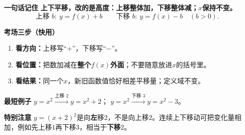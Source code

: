 \begin{summarybox}
  \textbf{\textcolor{CSummary}{一句话记住}}
  \textbf{上下平移，改的是高度：上移整体加，下移整体减；$x$保持不变。}
  \[
    \boxed{\text{上移 }b:\ y=f(x)+b}\qquad
    \boxed{\text{下移 }b:\ y=f(x)-b}\quad(b>0).
  \]

  \medskip
  \textbf{\textcolor{CSummary}{考场三步（快用）}}
  \begin{enumerate}[leftmargin=*,itemsep=0.22em,topsep=0.2em]
    \item \textbf{看方向：}上移写“$+$”，下移写“$-$”。
    \item \textbf{看位置：}把数加减在\textbf{整个$f(x)$外面}；不要随意放进$x$的括号里。
    \item \textbf{看结果：}同一个$x$，新旧函数值恰好相差平移量；定义域不变。
  \end{enumerate}

  \textbf{\textcolor{CSummary}{最短例子}}
  $y=x^2\xrightarrow{\text{上移 }2}y=x^2+2$；
  $y=x^2\xrightarrow{\text{下移 }3}y=x^2-3$。

  \medskip
  \textbf{\textcolor{CSummary}{特别注意}}
  $y=(x+2)^2$是向\textbf{左}移$2$，不是向上移$2$。连续上下移动可把变化量相加，例如先上移$1$再下移$3$，相当于\textbf{下移$2$}。
\end{summarybox}
